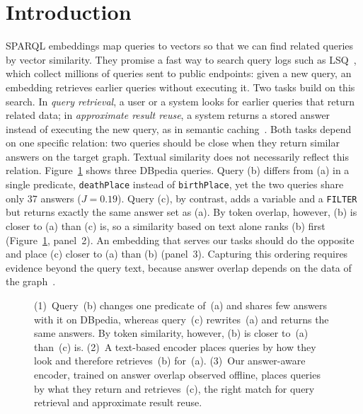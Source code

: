 \documentclass[runningheads]{llncs}
\begin{document}
\section{Introduction}
\label{sec:intro}

SPARQL embeddings map queries to vectors so that we can find related queries
by vector similarity. They promise a fast way to search query logs such as
LSQ~\cite{saleem2015lsq}, which collect millions of queries sent to public
endpoints: given a new query, an embedding retrieves earlier queries without
executing it. Two tasks build on this search. In \emph{query retrieval}, a
user or a system looks for earlier queries that return related data; in
\emph{approximate result reuse}, a system returns a stored answer instead of
executing the new query, as in semantic
caching~\cite{dar1996semanticcaching,papailiou2015caching}. Both tasks
depend on one specific relation: two queries should be close when they
return similar answers on the target graph.
Textual similarity does not necessarily reflect this relation. Figure~\ref{fig:gap}
shows three DBpedia queries. Query (b) differs from (a) in
a single predicate, \texttt{deathPlace} instead of \texttt{birthPlace}, yet
the two queries share only 37 answers ($J = 0.19$). Query (c), by contrast,
adds a variable and a \texttt{FILTER} but returns exactly the same answer set as (a). By token overlap, however, (b) is closer to (a) than (c) is, so a similarity based on text alone ranks (b) first (Figure~\ref{fig:gap}, panel~2). An embedding that serves our tasks should do the opposite and place (c) closer to (a) than (b) (panel~3).
Capturing this ordering requires evidence beyond the query text, because
answer overlap depends on the data of the graph~\cite{perez2009sparql}.

\begin{figure}[t]
\centering

\caption{\small{(1)~Query~(b)
changes one predicate of~(a) and shares few answers with it on DBpedia,
whereas query~(c) rewrites~(a) and returns the same answers. By token
similarity, however, (b) is closer to~(a) than~(c) is. (2)~A text-based
encoder places queries by how they look and therefore retrieves~(b) for~(a).
(3)~Our answer-aware encoder, trained on answer overlap observed offline,
places queries by what they return and retrieves~(c), the right match for
query retrieval and approximate result reuse.}}
\label{fig:gap}
\end{figure}
\end{document}
